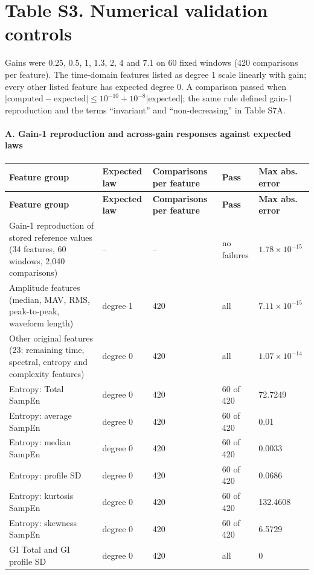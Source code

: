 \documentclass[10pt]{article}
\begin{document}
\section*{Table S3. Numerical validation controls}\label{tab:s3_validation}
Gains were 0.25, 0.5, 1, 1.3, 2, 4 and 7.1 on 60 fixed windows (420 comparisons per feature). The time-domain features listed as degree 1 scale linearly with gain; every other listed feature has expected degree 0. A comparison passed when $|\mathrm{computed}-\mathrm{expected}|\le10^{-10}+10^{-8}|\mathrm{expected}|$; the same rule defined gain-1 reproduction and the terms ``invariant'' and ``non-decreasing'' in Table S7A.
\paragraph{A. Gain-1 reproduction and across-gain responses against expected laws}
\begin{longtable}{p{7.4cm}p{2.0cm}p{2.4cm}p{1.6cm}p{3.4cm}}
\toprule
\textbf{Feature group} & \textbf{Expected law} & \textbf{Comparisons per feature} & \textbf{Pass} & \textbf{Max abs. error} \\
\midrule
\endfirsthead
\toprule
\textbf{Feature group} & \textbf{Expected law} & \textbf{Comparisons per feature} & \textbf{Pass} & \textbf{Max abs. error} \\
\midrule
\endhead
Gain-1 reproduction of stored reference values (34 features, 60 windows, 2,040 comparisons) & -- & -- & no failures & $1.78\times10^{-15}$ \\
Amplitude features (median, MAV, RMS, peak-to-peak, waveform length) & degree 1 & 420 & all & $7.11\times10^{-15}$ \\
Other original features (23: remaining time, spectral, entropy and complexity features) & degree 0 & 420 & all & $1.07\times10^{-14}$ \\
Entropy: Total SampEn & degree 0 & 420 & 60 of 420 & 72.7249 \\
Entropy: average SampEn & degree 0 & 420 & 60 of 420 & 0.01 \\
Entropy: median SampEn & degree 0 & 420 & 60 of 420 & 0.0033 \\
Entropy: profile SD & degree 0 & 420 & 60 of 420 & 0.0686 \\
Entropy: kurtosis SampEn & degree 0 & 420 & 60 of 420 & 132.4608 \\
Entropy: skewness SampEn & degree 0 & 420 & 60 of 420 & 6.5729 \\
GI Total and GI profile SD & degree 0 & 420 & all & 0 \\
\bottomrule
\end{longtable}
\end{document}
